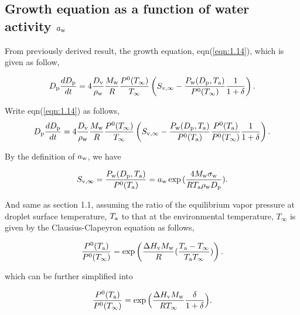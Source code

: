 \documentclass[12pt]{article}
\begin{document}
\subsection{Growth equation as a function of water activity $a_{\rm w}$}

From previously derived result, the growth equation, eqn(\ref{eqn:1.14}), which is given as follow,

\begin{equation}\label{2.1}
D_{\rm p}\frac{dD_{\rm p}}{dt}=4 \frac{D_{\rm v}} {\rho_{\rm w}} \frac{M_{\rm w}}{R} \frac{P^{\rm 0}(T_{\infty})} {T_{\infty}} \left(S_{v, \infty} - \frac{P_{\rm w}(D_{\rm p}, T_{\rm a})}{P^{\rm 0}(T_{\infty})} \frac{1}{1+\delta}\right).
\end{equation}

Write eqn(\ref{eqn:1.14}) as follows,
\begin{equation}\label{eqn:2.2}
D_{\rm p}\frac{dD_{\rm p}}{dt}=4 \frac{D_{\rm v}} {\rho_{\rm w}} \frac{M_{\rm w}}{R} \frac{P^{\rm 0}(T_{\infty})} {T_{\infty}} \left(S_{\rm v, \infty} - \frac{P_{\rm w}(D_{\rm p}, T_{\rm a})}{P^{\rm 0}(T_{\rm a})} \frac{P^{\rm 0}(T_{\rm a})}{P^{\rm 0}(T_{\infty})}\frac{1}{1+\delta}\right).
\end{equation}

By the definition of $a_{\rm w}$, we have

\begin{equation}\label{eqn:2.3}
S_{\rm v, \infty}= \frac{P_{\rm w}(D_{\rm p}, T_{\rm a})}{P^{\rm 0}(T_{\rm a})}=a_{\rm w}\exp{(\frac{4 M_{\rm w} \sigma_{\rm w}}{R T_{\rm a} \rho_{\rm w}D_{\rm p}})}.
\end{equation}

And same as section 1.1, assuming the ratio of the equilibrium vapor pressure at droplet surface temperature, $T_{\rm a}$ to that at the environmental temperature, $T_{\infty}$ is given by the Clausius-Clapeyron equation as follows,
  
\begin{equation}\label{eqn:2.4}
\frac{P^{\rm 0}(T_{\rm a})}{P^{\rm 0}(T_{\infty})}=\exp \left(\frac{\Delta H_{\rm v} M_{\rm w}}{R} (\frac{T_{\rm a}-T_{\infty}}{T_{\rm a} T_{\infty}})\right).
\end{equation}

which can be further simplified into 

\begin{equation}\label{eqn:2.5}
\frac{P^{\rm 0}(T_{\rm a})}{P^{\rm 0}(T_{\infty})}=\exp \Big(\frac{\Delta H_{\rm v} M_{\rm w}}{R T_{\infty}} \frac{\delta}{1+\delta}\Big).
\end{equation}
\end{document}
